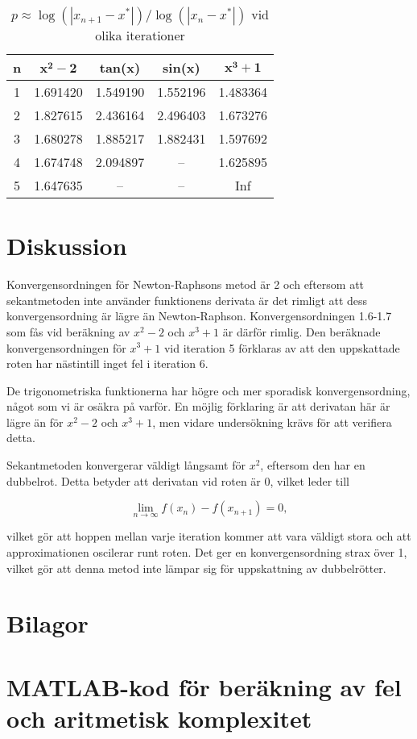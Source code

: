 \documentclass[a4paper,titlepage]{article}
\begin{document}
\begin{table}[h]
    \centering
    \begin{tabular}{c | c | c | c | c}
        \textbf{n} & $\mathbf{x^2 - 2}$ & \textbf{tan(x)} & \textbf{sin(x)} & $\mathbf{x^3 + 1}$ \\ \hline
        1 & 1.691420 & 1.549190 & 1.552196 & 1.483364 \\
        2 & 1.827615 & 2.436164 & 2.496403 & 1.673276 \\
        3 & 1.680278 & 1.885217 & 1.882431 & 1.597692 \\
        4 & 1.674748 & 2.094897 & --       & 1.625895 \\
        5 & 1.647635 & --       & --       & Inf \\
        
    \end{tabular}
    \label{tab:ps}
    \caption{$p \approx \log(|x_{n + 1} - x^*|)/\log(|x_n - x^*|)$ vid olika iterationer}
\end{table}

\section{Diskussion}

Konvergensordningen för Newton-Raphsons metod är 2 och eftersom att sekantmetoden
inte använder funktionens derivata är det rimligt att dess konvergensordning är lägre
än Newton-Raphson. Konvergensordningen 1.6-1.7 som fås vid beräkning av $x^2-2$ och
$x^3 + 1$ är därför rimlig. Den beräknade konvergensordningen för $x^3 + 1$ vid
iteration 5 förklaras av att den uppskattade roten har nästintill inget fel i
iteration 6.

De trigonometriska funktionerna har högre och mer sporadisk konvergensordning,
något som vi är osäkra på varför. En möjlig förklaring är att derivatan här är
lägre än för $x^2-2$ och $x^3 + 1$, men vidare undersökning krävs för att
verifiera detta.

Sekantmetoden konvergerar väldigt långsamt för $x^2$, eftersom den har en
dubbelrot. Detta betyder att derivatan vid roten är 0, vilket leder till

\[
    \lim_{n \to \infty} f(x_n) - f(x_{n+1}) = 0,
\]

vilket gör att hoppen mellan varje iteration kommer att vara väldigt stora och att
approximationen oscilerar runt roten. Det ger en konvergensordning strax över
1, vilket gör att denna metod inte lämpar sig för uppskattning av dubbelrötter.

\section*{Bilagor}
\appendix

\section{MATLAB-kod för beräkning av fel och aritmetisk komplexitet}
\label{sec:testcode}


\end{document}
